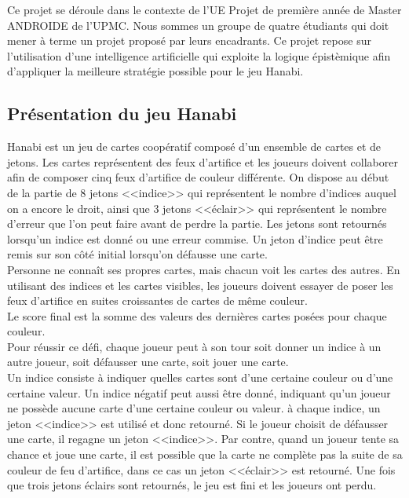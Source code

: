 \documentclass[11pt, letterpaper]{article}
\begin{document}
\noindent 
Ce projet se déroule dans le contexte de l'UE Projet de première année de Master ANDROIDE de l'UPMC. Nous sommes un groupe de quatre étudiants qui doit mener à terme un projet proposé par leurs encadrants. Ce projet repose sur l'utilisation d'une intelligence artificielle qui exploite la logique épistèmique afin d'appliquer la meilleure stratégie possible pour le jeu Hanabi.

\subsection{Présentation du jeu Hanabi}

\noindent
Hanabi est un jeu de cartes coopératif composé d'un ensemble de cartes et de jetons. Les cartes représentent des feux d'artifice et les joueurs doivent collaborer afin de composer cinq feux d'artifice de couleur différente. On dispose au début de la partie de 8 jetons <<indice>> qui représentent le nombre d'indices auquel on a encore le droit, ainsi que 3 jetons <<éclair>> qui représentent le nombre d'erreur que l'on peut faire avant de perdre la partie. Les jetons sont retournés lorsqu'un indice est donné ou une erreur commise. Un jeton d'indice peut être remis sur son côté initial lorsqu'on défausse une carte.\\

\noindent
Personne ne connaît ses propres cartes, mais chacun voit les cartes des autres. En utilisant des indices et les cartes visibles, les joueurs doivent essayer de poser les feux d'artifice en suites croissantes de cartes de même couleur.\\

\noindent
Le score final est la somme des valeurs des dernières cartes posées pour chaque couleur.\\

\noindent
Pour réussir ce défi, chaque joueur peut à son tour soit donner un indice à un autre joueur, soit défausser une carte, soit jouer une carte.\\

\noindent
Un indice consiste à indiquer quelles cartes sont d'une certaine couleur ou d'une certaine valeur. Un indice négatif peut aussi être donné, indiquant qu'un joueur ne possède aucune carte d'une certaine couleur ou valeur. à chaque indice, un jeton <<indice>> est utilisé et donc retourné. Si le joueur choisit de défausser une carte, il regagne un jeton <<indice>>. Par contre, quand un joueur tente sa chance et joue une carte, il est possible que la carte ne complète pas la suite de sa couleur de feu d'artifice, dans ce cas un jeton <<éclair>> est retourné. Une fois que trois jetons éclairs sont retournés, le jeu est fini et les joueurs ont perdu.\\
\end{document}

